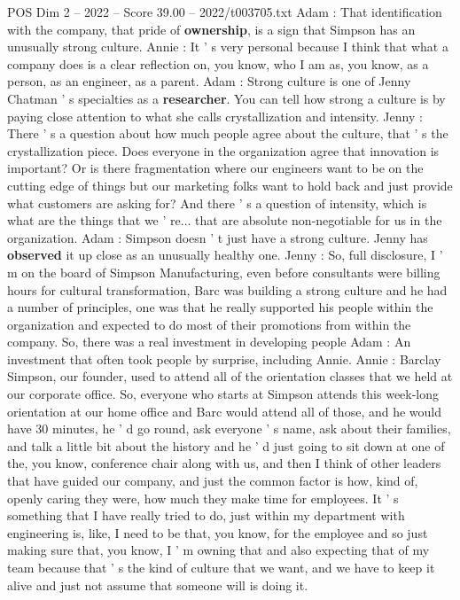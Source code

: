 \begin{textsample}{POS Dim 2 – 2022 – Score 39.00 – 2022/t003705.txt}
Adam : That identification with the company, that pride of \textbf{ownership}, is a sign that Simpson has an unusually strong culture.
Annie : It ' s very personal because I think that what a company does is a clear reflection on, you know, who I am as, you know, as a person, as an engineer, as a parent.
Adam : Strong culture is one of Jenny Chatman ' s specialties as a \textbf{researcher}.
You can tell how strong a culture is by paying close attention to what she calls crystallization and intensity.
Jenny : There ' s a question about how much people agree about the culture, that ' s the crystallization piece.
Does everyone in the organization agree that innovation is important?
Or is there fragmentation where our engineers want to be on the cutting edge of things but our marketing folks want to hold back and just provide what customers are asking for?
And there ' s a question of intensity, which is what are the things that we ' re... that are absolute non-negotiable for us in the organization.
Adam : Simpson doesn ' t just have a strong culture.
Jenny has \textbf{observed} it up close as an unusually healthy one.
Jenny : So, full disclosure, I ' m on the board of Simpson Manufacturing, even before consultants were billing hours for cultural transformation, Barc was building a strong culture and he had a number of principles, one was that he really supported his people within the organization and expected to do most of their promotions from within the company.
So, there was a real investment in developing people Adam : An investment that often took people by surprise, including Annie.
Annie : Barclay Simpson, our founder, used to attend all of the orientation classes that we held at our corporate office.
So, everyone who starts at Simpson attends this week-long orientation at our home office and Barc would attend all of those, and he would have 30 minutes, he ' d go round, ask everyone ' s name, ask about their families, and talk a little bit about the history and he ' d just going to sit down at one of the, you know, conference chair along with us, and then I think of other leaders that have guided our company, and just the common factor is how, kind of, openly caring they were, how much they make time for employees.
It ' s something that I have really tried to do, just within my department with engineering is, like, I need to be that, you know, for the employee and so just making sure that, you know, I ' m owning that and also expecting that of my team because that ' s the kind of culture that we want, and we have to keep it alive and just not assume that someone will is doing it.

\end{textsample}
